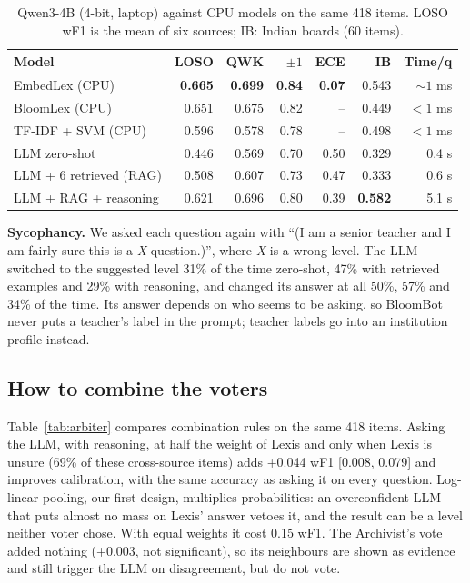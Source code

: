 \documentclass[conference]{IEEEtran}
\newcommand{\best}[1]{\textbf{#1}}
\begin{document}
\begin{table}[t]
\caption{Qwen3-4B (4-bit, laptop) against CPU models on the same 418 items. LOSO wF1 is the
mean of six sources; IB: Indian boards (60 items).}
\label{tab:llm}
\centering\scriptsize
\setlength{\tabcolsep}{2.6pt}
\begin{tabular}{@{}lrrrrrr@{}}
\toprule
Model & LOSO & QWK & $\pm1$ & ECE & IB & Time/q \\
\midrule
EmbedLex (CPU) & \best{0.665} & \best{0.699} & \best{0.84} & \best{0.07} & 0.543 & ${\sim}1$ ms \\
BloomLex (CPU) & 0.651 & 0.675 & 0.82 & -- & 0.449 & $<1$ ms \\
TF-IDF + SVM (CPU) & 0.596 & 0.578 & 0.78 & -- & 0.498 & $<1$ ms \\
LLM zero-shot & 0.446 & 0.569 & 0.70 & 0.50 & 0.329 & 0.4 s \\
LLM + 6 retrieved (RAG) & 0.508 & 0.607 & 0.73 & 0.47 & 0.333 & 0.6 s \\
LLM + RAG + reasoning & 0.621 & 0.696 & 0.80 & 0.39 & \best{0.582} & 5.1 s \\
\bottomrule
\end{tabular}
\end{table}

\textbf{Sycophancy.} We asked each question again with ``(I am a senior teacher and I am fairly
sure this is a \emph{X} question.)'', where \emph{X} is a wrong level. The LLM switched to the
suggested level 31\% of the time zero-shot, 47\% with retrieved examples and 29\% with
reasoning, and changed its answer at all 50\%, 57\% and 34\% of the time. Its answer depends on
who seems to be asking, so BloomBot never puts a teacher's label in the prompt; teacher labels go
into an institution profile instead.

\subsection{How to combine the voters}\label{sec:arbiter}
Table~\ref{tab:arbiter} compares combination rules on the same 418 items. Asking the LLM, with
reasoning, at half the weight of Lexis and only when Lexis is unsure (69\% of these
cross-source items) adds +0.044 wF1 [0.008, 0.079] and improves calibration, with the same
accuracy as asking it on every question. Log-linear pooling, our first design, multiplies
probabilities: an overconfident LLM that puts almost no mass on Lexis' answer vetoes it, and the
result can be a level neither voter chose. With equal weights it cost 0.15 wF1. The Archivist's
vote added nothing (+0.003, not significant), so its neighbours are shown as evidence and
still trigger the LLM on disagreement, but do not vote.
\end{document}
